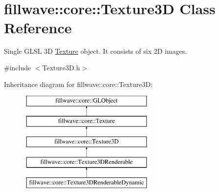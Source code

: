 \hypertarget{classfillwave_1_1core_1_1Texture3D}{}\section{fillwave\+:\+:core\+:\+:Texture3\+D Class Reference}
\label{classfillwave_1_1core_1_1Texture3D}


Single G\+L\+S\+L 3\+D \hyperlink{classfillwave_1_1core_1_1Texture}{Texture} object. It consists of six 2\+D images.  




{\ttfamily \#include $<$Texture3\+D.\+h$>$}

Inheritance diagram for fillwave\+:\+:core\+:\+:Texture3\+D\+:\begin{figure}[H]
\begin{center}
\leavevmode
\includegraphics[height=5.000000cm]{classfillwave_1_1core_1_1Texture3D}
\end{center}
\end{figure}
